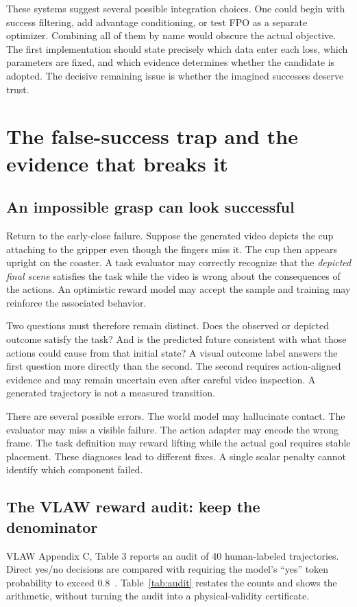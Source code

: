 These systems suggest several possible integration choices. One could begin with success filtering, add advantage conditioning, or test FPO as a separate optimizer. Combining all of them by name would obscure the actual objective. The first implementation should state precisely which data enter each loss, which parameters are fixed, and which evidence determines whether the candidate is adopted. The decisive remaining issue is whether the imagined successes deserve trust.

\section{The false-success trap and the evidence that breaks it}
\subsection{An impossible grasp can look successful}
Return to the early-close failure. Suppose the generated video depicts the cup attaching to the gripper even though the fingers miss it. The cup then appears upright on the coaster. A task evaluator may correctly recognize that the \emph{depicted final scene} satisfies the task while the video is wrong about the consequences of the actions. An optimistic reward model may accept the sample and training may reinforce the associated behavior.

Two questions must therefore remain distinct. Does the observed or depicted outcome satisfy the task? And is the predicted future consistent with what those actions could cause from that initial state? A visual outcome label answers the first question more directly than the second. The second requires action-aligned evidence and may remain uncertain even after careful video inspection. A generated trajectory is not a measured transition.

There are several possible errors. The world model may hallucinate contact. The evaluator may miss a visible failure. The action adapter may encode the wrong frame. The task definition may reward lifting while the actual goal requires stable placement. These diagnoses lead to different fixes. A single scalar penalty cannot identify which component failed.

\subsection{The VLAW reward audit: keep the denominator}
VLAW Appendix C, Table 3 reports an audit of 40 human-labeled trajectories. Direct yes/no decisions are compared with requiring the model's ``yes'' token probability to exceed $0.8$~\citep{vlaw}. Table~\ref{tab:audit} restates the counts and shows the arithmetic, without turning the audit into a physical-validity certificate.

